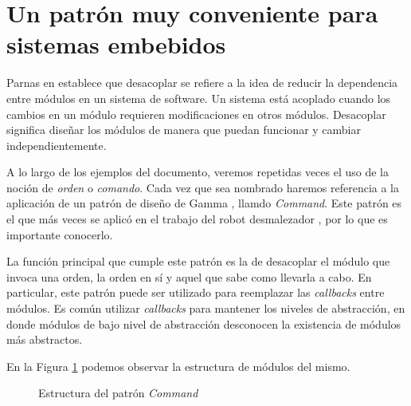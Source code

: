 \section{Un patrón muy conveniente para sistemas embebidos}
\label{patronCommand}

Parnas en \cite{Parnas1972} establece que desacoplar se refiere a la idea de reducir la dependencia entre módulos en un sistema de software. Un sistema está acoplado cuando los cambios en un módulo requieren modificaciones en otros módulos. Desacoplar significa diseñar los módulos de manera que puedan funcionar y cambiar independientemente.

A lo largo de los ejemplos del documento, veremos repetidas veces el uso de la noción de \textit{orden} o \textit{comando}. Cada vez que sea nombrado haremos referencia a la aplicación de un patrón de diseño de Gamma \cite{Gamma:1995:DPE:186897}, llamdo \textit{Command}. Este patrón es el que más veces se aplicó en el trabajo del robot desmalezador \cite{laura}, por lo que es importante conocerlo.

La función principal que cumple este patrón es la de desacoplar el módulo que invoca una orden, la orden en sí y aquel que sabe como llevarla a cabo. En particular, este patrón puede ser utilizado para reemplazar las \textit{callbacks} entre módulos. Es común utilizar \textit{callbacks} para mantener los niveles de abstracción, en donde módulos de bajo nivel de abstracción desconocen la existencia de módulos más abstractos.

En la Figura \ref{commandEst} podemos observar la estructura de módulos del mismo.


\begin{figure}[H]
\caption{Estructura del patrón \textit{Command}}
\label{commandEst}
\begin{center}
\end{center}
\end{figure}

